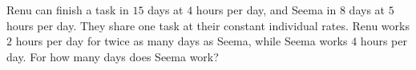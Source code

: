 Renu can finish a task in $15$ days at $4$ hours per day, and Seema in $8$ days at $5$ hours per day. They share one task at their constant individual rates. Renu works $2$ hours per day for twice as many days as Seema, while Seema works $4$ hours per day. For how many days does Seema work?
